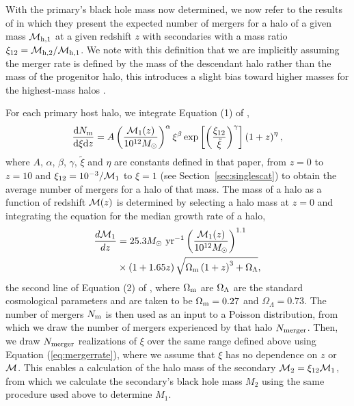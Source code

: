 \documentclass[a4paper,twocolumn]{emulateapj}
\begin{document}
{With the primary's black hole mass now determined, we now refer to the results of \citet{Fakhouri:2010a} in which they present the expected number of mergers for a halo of a given mass ${\cal M}_{\rm h,1}$ at a given redshift $z$ with secondaries with a mass ratio $\xi_{12} = {\cal M}_{\rm h,2}/{\cal M}_{\rm h,1}$. We note with this definition that we are implicitly assuming the merger rate is defined by the mass of the descendant halo rather than the mass of the progenitor halo, this introduces a slight bias toward higher masses for the highest-mass halos \citep{Genel:2009a}.

For each primary host halo, we integrate Equation (1) of \citet{Fakhouri:2010a},
\begin{equation}
\frac{{\rm d}N_{\rm m}}{{\rm d}\xi {\rm d}z} = A \left(\frac{{\cal M}_{1}(z)}{10^{12} M_{\odot}}\right)^{\alpha} \xi^{\beta} \exp \left[\left(\frac{\xi_{12}}{\tilde{\xi}}\right)^{\gamma}\right] \left(1 + z\right)^{\eta},\label{eq:mergerrate}
\end{equation}
where $A$, $\alpha$, $\beta$, $\gamma$, $\tilde{\xi}$ and $\eta$ are constants defined in that paper, from $z = 0$ to $z = 10$ and $\xi_{12} = 10^{-3}/{\cal M}_{1}$ to $\xi = 1$ (see Section~\ref{sec:singlescat}) to obtain the average number of mergers for a halo of that mass. The mass of a halo as a function of redshift ${\cal M}(z)$ is determined by selecting a halo mass at $z = 0$ and integrating the equation for the median growth rate of a halo,
\begin{align}
\frac{d{\cal M}_{1}}{dz} &= 25.3 M_{\odot}~{\rm yr}^{-1} \left(\frac{{\cal M}_{1}(z)}{10^{12} M_{\odot}}\right)^{1.1}\nonumber\\
&\times\left(1 + 1.65 z\right) \sqrt{\Omega_{\rm m} \left(1 + z\right)^{3}+\Omega_{\Lambda}}\label{eq:mediangrowth},
\end{align}
the second line of Equation (2) of \citeauthor{Fakhouri:2010a}, where $\Omega_{\rm m}$ are $\Omega_{\rm \Lambda}$ are the standard cosmological parameters and are taken to be $\Omega_{\rm m} = 0.27$ and $\Omega_{\Lambda} = 0.73$. The number of mergers $N_{\rm m}$ is then used as an input to a Poisson distribution, from which we draw the number of mergers experienced by that halo $N_{\rm merger}$. Then, we draw $N_{\rm merger}$ realizations of $\xi$ over the same range defined above using Equation (\ref{eq:mergerrate}), where we assume that $\xi$ has no dependence on $z$ or ${\cal M}$. This enables a calculation of the halo mass of the secondary ${\cal M}_{2} = \xi_{12}{\cal M}_{1}$, from which we calculate the secondary's black hole mass $M_{2}$ using the same procedure used above to determine $M_{1}$.

}
\end{document}
